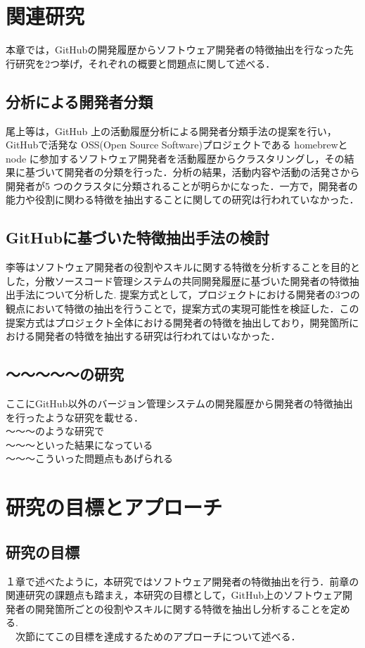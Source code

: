 \documentclass{funthesis}
\begin{document}
\chapter{関連研究}
本章では，GitHubの開発履歴からソフトウェア開発者の特徴抽出を行なった先行研究を2つ挙げ，それぞれの概要と問題点に関して述べる．
\section{分析による開発者分類}
尾上等は，GitHub 上の活動履歴分析による開発者分類手法の提案を行い，GitHubで活発な OSS(Open Source Software)プロジェクトである homebrewとnode に参加するソフトウェア開発者を活動履歴からクラスタリングし，その結果に基づいて開発者の分類を行った\cite{Onoue_Japan}．分析の結果，活動内容や活動の活発さから開発者が5 つのクラスタに分類されることが明らかになった．一方で，開発者の能力や役割に関わる特徴を抽出することに関しての研究は行われていなかった．
\section{GitHubに基づいた特徴抽出手法の検討}
李等はソフトウェア開発者の役割やスキルに関する特徴を分析することを目的とした，分散ソースコード管理システムの共同開発履歴に基づいた開発者の特徴抽出手法について分析した\cite{risyo}. 提案方式として，プロジェクトにおける開発者の3つの観点において特徴の抽出を行うことで，提案方式の実現可能性を検証した．この提案方式はプロジェクト全体における開発者の特徴を抽出しており，開発箇所における開発者の特徴を抽出する研究は行われてはいなかった．
\section{〜〜〜〜〜の研究}
ここにGitHub以外のバージョン管理システムの開発履歴から開発者の特徴抽出を行ったような研究を載せる．
\\〜〜〜のような研究で
\\〜〜〜といった結果になっている
\\〜〜〜こういった問題点もあげられる
\chapter{研究の目標とアプローチ}
\section{研究の目標}
１章で述べたように，本研究ではソフトウェア開発者の特徴抽出を行う．前章の関連研究の課題点も踏まえ，本研究の目標として，GitHub上のソフトウェア開発者の開発箇所ごとの役割やスキルに関する特徴を抽出し分析することを定める.
\\　次節にてこの目標を達成するためのアプローチについて述べる．
\end{document}
